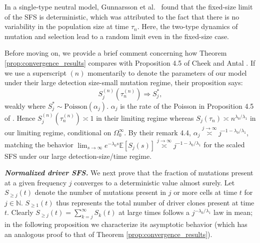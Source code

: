\documentclass{article}
\numberwithin{equation}{section}
\newcommand{\ordas}[2]{\overset{{#1}\to {#2}}{\asymp}}
\begin{document}
In a single-type neutral model, Gunnarsson et al.~\cite{gunnarsson2025} found that the fixed-size limit of the SFS is deterministic, which was attributed to the fact that there is no variability in the population size at time $\tau_n$.
Here, the two-type dynamics of mutation and selection lead to a random limit even in the fixed-size case.

Before moving on, we provide a brief comment concerning how Theorem \ref{prop:convergence_results} compares with Proposition 4.5 of Cheek and Antal \cite{cheek2018}. If we use a superscript $(n)$ momentarily to denote the parameters of our model under their large detection size-small mutation regime, their proposition says:
\[S_j^{(n)}(\tau_n^{(n)})\Longrightarrow S_j^\ast,\]
weakly where $S_j^\ast\sim \text{Poisson}(\alpha_j)$. $\alpha_j$ is the rate of the Poisson in Proposition 4.5 of \cite{cheek2018}. Hence  $S_j^{(n)}(\tau_n^{(n)})\asymp 1$ in their limiting regime whereas $S_j(\tau_n)\asymp n^{\lambda_0/\lambda_1}$ in our limiting regime, conditional on $\Omega_0^\infty$. By their remark 4.4, $\alpha_j\ordas{j}{\infty}j^{-1-\lambda_0/\lambda_1}$, matching the behavior $\lim_{s\to\infty} e^{-\lambda_0 s}\mathbb{E}[S_j(s)]\ordas{j}{\infty} j^{-1-\lambda_0/\lambda_1}$ for the scaled SFS under our large detection-size/time regime.



{\bf \em Normalized driver SFS.} We next prove that the fraction of mutations present at a given frequency $j$ converges to a deterministic value almost surely. 
Let $S_{\geq j}(t)$ denote the number of mutations present in $j$ or more cells at time $t$ for $j\in \mathbb{N}$. $S_{\geq 1}(t)$ thus represents the total number of driver clones present at time $t$. Clearly $S_{\geq j}(t)=\sum_{k=j}^\infty S_k(t)$ at large times follows a $j^{-\lambda_0/\lambda_1}$ law in mean; in the following proposition we characterize its asymptotic behavior (which has an analogous proof to that of Theorem \ref{prop:convergence_results}).
\end{document}
